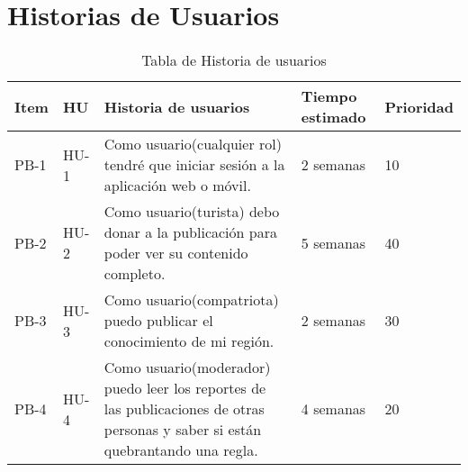 \chapter{Historias de Usuarios}
\begin{table}[htbp]
	\begin{center}
		\begin{tabular}{|l|l|p{5cm}|l|l|}
			\hline
			Item&HU&Historia de usuarios&Tiempo estimado&Prioridad \\
			\hline \hline
			PB-1&HU-1&
			Como usuario(cualquier rol) tendré que iniciar sesión a la aplicación web o móvil.
			&2 semanas&10
			\\ \hline
			PB-2&HU-2&
			Como usuario(turista) debo donar a la publicación para poder ver su contenido completo.
			&5 semanas&40
			\\ \hline
			PB-3&HU-3&
			Como usuario(compatriota) puedo publicar el conocimiento de mi región.
			&2 semanas&30
			\\ \hline
			PB-4&HU-4&
			Como usuario(moderador) puedo leer los reportes de las publicaciones de otras personas y saber si están quebrantando una regla.
			&4 semanas&20
			\\ \hline
			
			
						
		\end{tabular}
		\caption {Tabla de Historia de usuarios}
	\end{center}
\end{table}